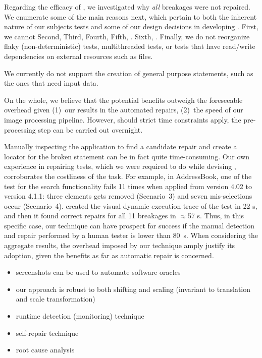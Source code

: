 Regarding the efficacy of \tool, we investigated why \emph{all}  breakages were not repaired. We enumerate some of the main reasons next, which pertain to both the inherent nature of our subjects tests and some of our design decisions in developing \tool. 
First, we cannot 
Second, 
Third, 
Fourth, 
Fifth, .  
Sixth, . 
Finally, we do not reorganize flaky (non-deterministic) tests, multithreaded tests, or tests that have read/write dependencies on external resources such as files.

We currently do not support the creation of general purpose statements, such as the ones that need input data.

On the whole, we believe that the potential benefits outweigh the foreseeable overhead given (1)~our results in the automated repairs, (2)~the speed of our image processing pipeline. However, should strict time constraints apply, the pre-processing step can be carried out overnight.

Manually inspecting the application to find a candidate repair  and create a locator for the broken statement can be in fact quite time-consuming. Our own experience in repairing tests, which we were required to do while devising \tool, corroborates the costliness of the task. For example, in AddressBook, one of the test for the search functionality fails 11 times when applied from version 4.02 to version 4.1.1: three elements gets removed (Scenario~3) and seven mis-selections occur (Scenario~4). \tool created the visual dynamic execution trace of the test in 22 s, and then it found correct repairs for all 11 breakages in $\approx$57 s. Thus, in this specific case, our technique can have prospect for success if the manual detection and repair performed by a human tester is lower than 80~s. When considering the aggregate results, the overhead imposed by our technique amply justify its adoption, given the benefits as far as automatic repair is concerned.  

\begin{itemize}
\item screenshots can be used to automate software oracles
\item our approach is robust to both shifting and scaling (invariant to translation and scale transformation)
\item runtime detection (monitoring) technique
\item self-repair technique
\item root cause analysis
\end{itemize}

